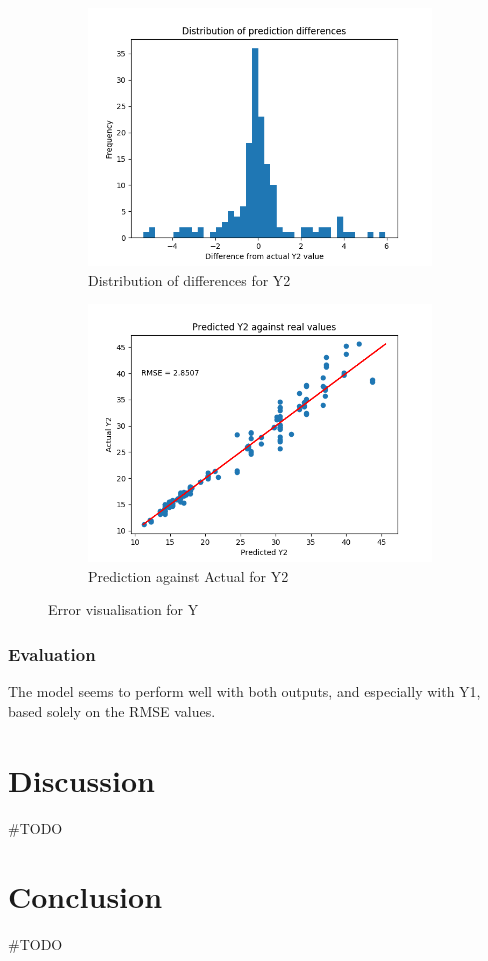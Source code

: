 \documentclass[12pt]{article}
\begin{document}
\begin{figure}[!ht]
\centering
\begin{subfigure}{.5\textwidth}
  \centering
  \includegraphics[width=\linewidth]{images/Y2errordist}
  \caption{Distribution of differences for Y2}
  \label{fig:y2diffdist}
\end{subfigure}%
\begin{subfigure}{.5\textwidth}
  \centering
  \includegraphics[width=\linewidth]{images/Y2scatter}
  \caption{Prediction against Actual for Y2}
  \label{fig:y2diffscatter}
\end{subfigure}
\caption{Error visualisation for Y}
\label{fig:y2error}
\end{figure}

\section{Evaluation}

The model seems to perform well with both outputs, and especially with Y1, based solely on the RMSE values. 

\part{Discussion}

\#TODO

\part{Conclusion}

\#TODO



\end{document}
